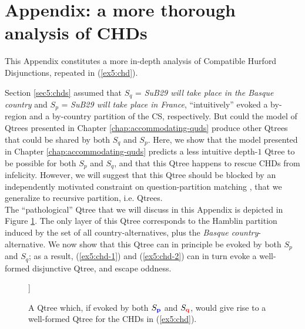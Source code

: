 \section{Appendix: a more thorough analysis of CHDs}\label{apdx5:chds}

This Appendix constitutes a more in-depth analysis of Compatible Hurford Disjunctions, repeated in (\ref{ex5:chd}). 

\begin{exe}
	\begin{xlist}
	\end{xlist}
\end{exe} 

Section \ref{sec5:chds} assumed that $S_q$ = \textit{SuB29 will take place in the Basque country} and $S_p$ = \textit{SuB29 will take place in France}, ``intuitively'' evoked a by-region and a by-country partition of the CS, respectively. But could the model of Qtrees presented in Chapter \ref{chap:accommodating-quds} produce other Qtrees that could be shared by both $S_q$ and $S_p$. Here, we show that the model presented in Chapter \ref{chap:accommodating-quds} predicts a less intuitive depth-$1$ Qtree to be possible for both $S_p$ and $S_q$, and that this Qtree happens to rescue CHDs from infelicity. However, we will suggest that this Qtree should be blocked by an independently motivated constraint on question-partition matching \citep{Fox2018}, that we generalize to recursive partition, i.e. Qtrees.\\


The ``pathological'' Qtree that we will discuss in this Appendix is depicted in Figure \ref{fig5:qtree-tentative-chd}. The only layer of this Qtree corresponds to the Hamblin partition induced by the set of all country-alternatives, plus the \textit{Basque country}-alternative. We now show that this Qtree can in principle be evoked by both $S_{p}$ and $S_{q}$; as a result, (\ref{ex5:chd-1}) and (\ref{ex5:chd-2}) can in turn evoke a well-formed disjunctive Qtree, and escape oddness.

\begin{figure}[H]
	\centering
	\begin{forest}
		[CS[{\textcolor{blue}{France}$\wedge$\textcolor{red}{Basque}}][{\textcolor{blue}{Spain}$\wedge$\textcolor{red}{Basque}}][{\textcolor{blue}{France}$\wedge\neg$\textcolor{red}{Basque}}][{\textcolor{blue}{Spain}$\wedge\neg$\textcolor{red}{Basque}}][...]]
	\end{forest}
	\caption[]{A Qtree which, if evoked by both $S_{\textbf{\textcolor{blue}{p}}}$ and $S_{\textbf{\textcolor{red}{q}}}$, would give rise to a well-formed Qtree for the CHDs in (\ref{ex5:chd}).}\label{fig5:qtree-tentative-chd}
\end{figure}

